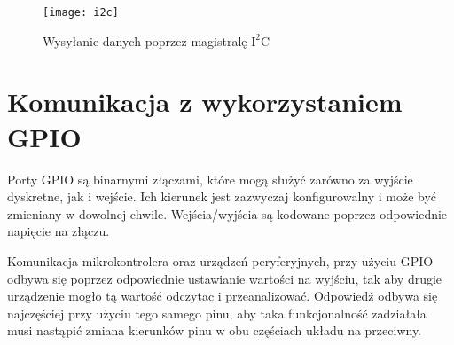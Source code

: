 \begin{figure}[h]
\centering
\texttt{[image: i2c]}
\caption{Wysyłanie danych poprzez magistralę $\mathrm{I^{2}C}$}
\label{fig:i2c}
\end{figure}

\section{Komunikacja z wykorzystaniem GPIO}
Porty GPIO są binarnymi złączami, które mogą służyć zarówno za wyjście dyskretne, jak i wejście. Ich kierunek jest zazwyczaj konfigurowalny i może być zmieniany w dowolnej chwile. Wejścia/wyjścia są kodowane poprzez odpowiednie napięcie na złączu.

Komunikacja mikrokontrolera oraz urządzeń peryferyjnych, przy użyciu GPIO odbywa się poprzez odpowiednie ustawianie wartości na wyjściu, tak aby drugie urządzenie mogło tą wartość odczytac i przeanalizować. Odpowiedź odbywa się najczęściej przy użyciu tego samego pinu, aby taka funkcjonalność zadziałała musi nastąpić zmiana kierunków pinu w obu częściach układu na przeciwny.
